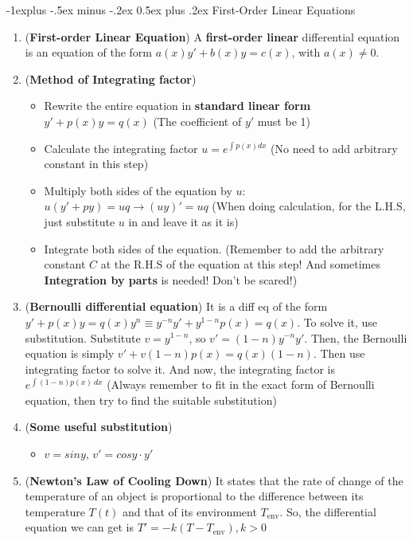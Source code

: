\documentclass[10pt, landscape]{article}
\makeatletter
\renewcommand{\subsection}{\@startsection{subsection}{2}{0mm}%
                                {-1explus -.5ex minus -.2ex}%
                                {0.5ex plus .2ex}%
                                {\normalfont\normalsize\bfseries}}
\makeatother
\begin{document}
\begin{multicols}{4}
\subsection{First-Order Linear Equations}
\begin{enumerate}
    \item (\textbf{First-order Linear Equation}) A \textbf{first-order linear} differential equation is an equation of the form $a(x)y'+b(x)y=c(x)$, with $a(x)\neq 0$.
    \item (\textbf{Method of Integrating factor})
    \begin{itemize}
        \item Rewrite the entire equation in \textbf{standard linear form} $y'+p(x)y=q(x)$ (The coefficient of $y'$ must be 1)
        \item Calculate the integrating factor $u=e^{\int p(x)dx}$ (No need to add arbitrary constant in this step)
        \item Multiply both sides of the equation by $u$: $u(y'+py)=uq\rightarrow (uy)'=uq$ (When doing calculation, for the L.H.S, just substitute $u$ in and leave it as it is)
        \item Integrate both sides of the equation. (Remember to add the arbitrary constant $C$ at the R.H.S of the equation at this step! And sometimes \textbf{Integration by parts} is needed! Don't be scared!)
    \end{itemize}
    \item (\textbf{Bernoulli differential equation}) It is a diff eq of the form $y'+p(x)y=q(x)y^n\equiv y^{-n}y'+y^{1-n}p(x)=q(x)$. To solve it, use substitution. Substitute $v=y^{1-n}$, so $v'=(1-n)y^{-n}y'$. Then, the Bernoulli equation is simply $v'+v(1-n)p(x)=q(x)(1-n)$. Then use integrating factor to solve it. And now, the integrating factor is $e^{\int (1-n)p(x)~dx}$ (Always remember to fit in the exact form of Bernoulli equation, then try to find the suitable substitution)
    \item (\textbf{Some useful substitution})
    \begin{itemize}
        \item $v=siny$, $v'=cosy\cdot y'$
    \end{itemize}
    \item (\textbf{Newton's Law of Cooling Down}) It states that the rate of change of the temperature of an object is proportional to the difference between its temperature $T(t)$ and that of its environment $T_{\text{env}}$. So, the differential equation we can get is $T'=-k(T-T_{\text{env}}),k>0$
\end{enumerate}

\end{multicols}
\end{document}
